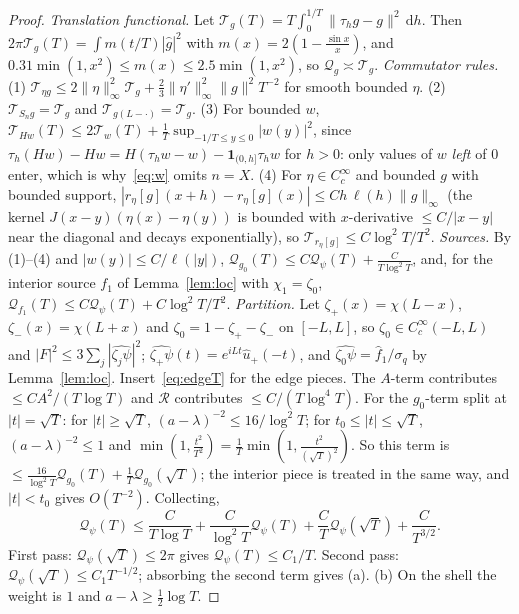\documentclass[11pt]{amsart}
\newcommand{\one}{\mathbf{1}}
\newcommand{\dd}{\,\mathrm{d}}
\theoremstyle{definition}
\theoremstyle{remark}
\numberwithin{equation}{section}
\begin{document}
\begin{proof}
\emph{Translation functional.} Let $\mathcal T_g(T)=T\int_0^{1/T}\|\tau_hg-g\|^2\dd h$. Then $2\pi\mathcal T_g(T)=\int m(t/T)|\hat g|^2$ with $m(x)=2(1-\frac{\sin x}x)$, and $0.31\min(1,x^2)\le m(x)\le2.5\min(1,x^2)$, so $\mathcal Q_g\asymp\mathcal T_g$.
\emph{Commutator rules.} (1) $\mathcal T_{\eta g}\le2\|\eta\|_\infty^2\mathcal T_g+\frac23\|\eta'\|_\infty^2\|g\|^2T^{-2}$ for smooth bounded $\eta$. (2) $\mathcal T_{S_ng}=\mathcal T_g$ and $\mathcal T_{g(L-\cdot)}=\mathcal T_g$. (3) For bounded $w$, $\mathcal T_{Hw}(T)\le2\mathcal T_w(T)+\frac1T\sup_{-1/T\le y\le0}|w(y)|^2$, since $\tau_h(Hw)-Hw=H(\tau_hw-w)-\one_{(0,h]}\tau_hw$ for $h>0$: only values of $w$ \emph{left} of $0$ enter, which is why~\eqref{eq:w} omits $n=X$. (4) For $\eta\in C_c^\infty$ and bounded $g$ with bounded support, $|r_\eta[g](x+h)-r_\eta[g](x)|\le Ch\,\ell(h)\|g\|_\infty$ (the kernel $J(x-y)(\eta(x)-\eta(y))$ is bounded with $x$-derivative $\le C/|x-y|$ near the diagonal and decays exponentially), so $\mathcal T_{r_\eta[g]}\le C\log^2T/T^2$.
\emph{Sources.} By (1)--(4) and $|w(y)|\le C/\ell(|y|)$, $\mathcal Q_{g_0}(T)\le C\mathcal Q_\psi(T)+\frac C{T\log^2T}$, and, for the interior source $f_1$ of Lemma~\ref{lem:loc} with $\chi_1=\zeta_0$, $\mathcal Q_{f_1}(T)\le C\mathcal Q_\psi(T)+C\log^2T/T^2$.
\emph{Partition.} Let $\zeta_+(x)=\chi(L-x)$, $\zeta_-(x)=\chi(L+x)$ and $\zeta_0=1-\zeta_+-\zeta_-$ on $[-L,L]$, so $\zeta_0\in C_c^\infty(-L,L)$ and $|F|^2\le3\sum_j|\widehat{\zeta_j\psi}|^2$; $\widehat{\zeta_+\psi}(t)=e^{iLt}\hat u_+(-t)$, and $\widehat{\zeta_0\psi}=\hat f_1/\sigma_q$ by Lemma~\ref{lem:loc}. Insert~\eqref{eq:edgeT} for the edge pieces. The $A$-term contributes $\le CA^2/(T\log T)$ and $\mathcal R$ contributes $\le C/(T\log^4T)$. For the $g_0$-term split at $|t|=\sqrt T$: for $|t|\ge\sqrt T$, $(a-\lambda)^{-2}\le16/\log^2T$; for $t_0\le|t|\le\sqrt T$, $(a-\lambda)^{-2}\le1$ and $\min(1,\frac{t^2}{T^2})=\frac1T\min(1,\frac{t^2}{(\sqrt T)^2})$. So this term is $\le\frac{16}{\log^2T}\mathcal Q_{g_0}(T)+\frac1T\mathcal Q_{g_0}(\sqrt T)$; the interior piece is treated in the same way, and $|t|<t_0$ gives $O(T^{-2})$. Collecting,
\[
\mathcal Q_\psi(T)\le\frac C{T\log T}+\frac C{\log^2T}\mathcal Q_\psi(T)+\frac CT\mathcal Q_\psi(\sqrt T)+\frac C{T^{3/2}} .
\]
First pass: $\mathcal Q_\psi(\sqrt T)\le2\pi$ gives $\mathcal Q_\psi(T)\le C_1/T$. Second pass: $\mathcal Q_\psi(\sqrt T)\le C_1T^{-1/2}$; absorbing the second term gives (a). (b) On the shell the weight is $1$ and $a-\lambda\ge\frac12\log T$.
\end{proof}
\end{document}
